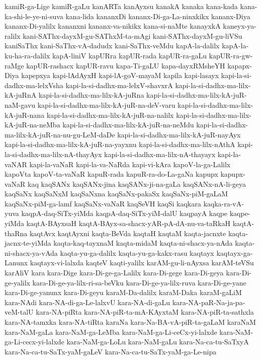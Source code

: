 {kamiR-ga-Lige
kamiR-gaLu
kanARTa
kanAyxsu
kanakA
kanaka
kana-kada
kana-ka-shi-le-ye-ni-suva
kana-lida
kananxDi
kananx-Di-ga-La-ninxkikx
kananx-Diya
kananx-Di-yalilx
kananxni
kananx-va-nikikx
kana-si-naMte
kanayxkA
kaneyx-ya-ralilx
kani-SAThx-dayxM-gu-SAThxM-ta-mAgi
kani-SAThx-dayxM-gu-liVSu
kaniSaThx
kani-SaThx-vA-dadudx
kani-SaThx-veMdu
kapA-la-dalilx
kapA-la-ku-ha-ra-dalilx
kapA-liniV
kapURra
kapUR-rada
kapUR-ra-gaLu
kapUR-ra-gw-raMge
kapUR-rashacx
kapUR-ravu
kapa-Ti-gaLU
kapa-dayxRMsheYH
kapapx-Diya
kapepxya
kapi-lAdAyxH
kapi-lA-goV-mayaM
kapila
kapi-lasayx
kapi-la-si-dadhx-ma-lelxVsha
kapi-la-si-dadhx-ma-lelxV-shavxrA
kapi-la-si-dadhx-ma-lilx-kA-juRnA
kapi-la-si-dadhx-ma-lilx-kA-juRna
kapi-la-si-dadhx-ma-lilx-kA-juR-naM-gavu
kapi-la-si-dadhx-ma-lilx-kA-juR-na-deV-varu
kapi-la-si-dadhx-ma-lilx-kA-juR-nana
kapi-la-si-dadhx-ma-lilx-kA-juR-na-nalilx
kapi-la-si-dadhx-ma-lilx-kA-juR-na-neMba
kapi-la-si-dadhx-ma-lilx-kA-juR-na-neMdu
kapi-la-si-dadhx-ma-lilx-kA-juR-na-nu-gu-LeM-daDe
kapi-la-si-dadhx-ma-lilx-kA-juR-nayAyx
kapi-la-si-dadhx-ma-lilx-kA-juR-na-yayxnu
kapi-la-si-dadhx-ma-lilx-nAthA
kapi-la-si-dadhx-ma-lilx-nA-thayAyx
kapi-la-si-dadhx-ma-lilx-nA-thayayx
kapi-la-vaNAR
kapi-la-vaNaR
kapi-la-va-NaRda
kapi-vi-kAra
kapoV-la-ga-Lalilx
kapoVta
kapoV-ta-vaNaR
kapuR-rada
kapuR-ra-do-La-gaNa
kapupx
kapupx-vaNaR
kaq
kaqSANx
kaqSANx-jina
kaqSANx-ji-na-gaLa
kaqSANx-nA-li-geya
kaqSaNx
kaqSaNxM
kaqSaNxna
kaqSaNx-pakaSx
kaqSaNx-piM-gaLaM
kaqSaNx-piM-ga-lamf
kaqSaNx-vaNaR
kaqSeVH
kaqSi
kaqkara
kaqka-ra-vA-yuva
kaqpA-daq-SiTx-yiMda
kaqpA-daq-SiTx-yiM-dalU
kaqpayA
kaqpe
kaqpe-yiMda
kaqtA-BAyxsaH
kaqtA-BAyx-sa-shacx-yAR-pA-dA-nu-va-taRkaH
kaqtA-thaRna
kaqtAvx
kaqtAyxni
kaqta-BeVda
kaqtaH
kaqtaM
kaqta-jacnxte
kaqta-jacnx-te-yiMda
kaqta-kaq-tayxnaM
kaqta-midaM
kaqta-ni-shacx-ya-nAda
kaqta-ni-shacx-ya-vAda
kaqta-yu-ga-dalilx
kaqta-yu-ga-kakx-rasu
kaqtayx
kaqtayx-ga-Lanunx
kaqtayx-vi-lalxda
kaqteV
kaqti-yalilx
karAM-gu-li-nAyxsa
karAM-teVSu
karAliV
kara
kara-Dige
kara-Di-ge-ga-Lalilx
kara-Di-gege
kara-Di-geya
kara-Di-ge-yalilx
kara-Di-ge-ya-lilx-ri-sa-beVku
kara-Di-ge-ya-lilx-ruva
kara-Di-ge-yane
kara-Di-ge-yanunx
kara-Di-geyu
karaM-Da-dalilx
karaM-Daka
karaM-gaLiM
kara-NAdi
kara-NA-di-ga-Le-lalxvU
kara-NA-di-gaLu
kara-NA-paR-Na-ja-pa-veM-talU
kara-NA-piRta
kara-NA-piR-ta-mA-KAyxtaM
kara-NA-piR-ta-sathxla
kara-NA-tamxka
kara-NA-tiRta
karaNa
kara-Na-BA-vA-piR-ta-gaLaM
karaNaM
kara-NaM-gaLa
kara-NaM-ga-LeMba
kara-NaM-ga-Li-ceCx-yi-lalxde
kara-NaM-ga-Li-cecx-yi-lalxde
kara-NaM-ga-LoLu
kara-NaM-gaLu
kara-Na-ca-tu-SaTxyA
kara-Na-ca-tu-SaTx-yaM-gaLeV
kara-Na-ca-tu-SaTx-yaM-ga-Le-nipa
}
